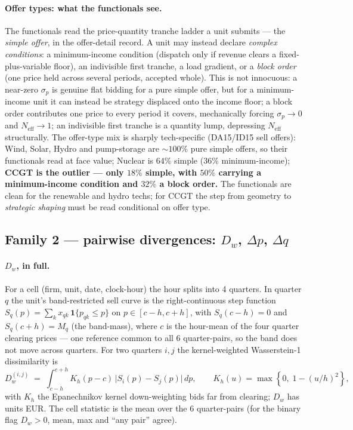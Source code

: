 \documentclass[11pt,a4paper]{article}
\begin{document}
\paragraph{Offer types: what the functionals see.} The functionals read the price-quantity tranche ladder a unit submits --- the \emph{simple offer}, in the offer-detail record. A unit may instead declare \emph{complex conditions}: a minimum-income condition (dispatch only if revenue clears a fixed-plus-variable floor), an indivisible first tranche, a load gradient, or a \emph{block order} (one price held across several periods, accepted whole). This is not innocuous: a near-zero $\sigma_p$ is genuine flat bidding for a pure simple offer, but for a minimum-income unit it can instead be strategy displaced onto the income floor; a block order contributes one price to every period it covers, mechanically forcing $\sigma_p \to 0$ and $N_{\text{eff}} \to 1$; an indivisible first tranche is a quantity lump, depressing $N_{\text{eff}}$ structurally. The offer-type mix is sharply tech-specific (DA15/ID15 sell offers): Wind, Solar, Hydro and pump-storage are $\sim\!100\%$ pure simple offers, so their functionals read at face value; Nuclear is $64\%$ simple ($36\%$ minimum-income); \textbf{CCGT is the outlier --- only $18\%$ simple, with $50\%$ carrying a minimum-income condition and $32\%$ a block order.} The functionals are clean for the renewable and hydro techs; for CCGT the step from geometry to \emph{strategic shaping} must be read conditional on offer type.

\subsection{Family 2 --- pairwise divergences: $D_w$, $\Delta p$, $\Delta q$}\label{sec:prov:dw_decomp_def}

\paragraph{$D_w$, in full.}
For a cell (firm, unit, date, clock-hour) the hour splits into 4 quarters. In quarter $q$ the unit's band-restricted sell curve is the right-continuous step function $S_q(p) = \sum_k x_{qk}\,\mathbf{1}\{p_{qk}\le p\}$ on $p\in[c-h,c+h]$, with $S_q(c-h)=0$ and $S_q(c+h)=M_q$ (the band-mass), where $c$ is the hour-mean of the four quarter clearing prices --- one reference common to all 6 quarter-pairs, so the band does not move across quarters. For two quarters $i,j$ the kernel-weighted Wasserstein-1 dissimilarity is
\[
 D^{(i,j)}_w \;=\; \int_{c-h}^{c+h}\! K_h(p-c)\,\big|S_i(p)-S_j(p)\big|\,dp, \qquad K_h(u) = \max\!\left\{0,\;1-(u/h)^2\right\},
\]
with $K_h$ the Epanechnikov kernel down-weighting bids far from clearing; $D_w$ has units EUR. The cell statistic is the mean over the 6 quarter-pairs (for the binary flag $D_w>0$, mean, max and ``any pair'' agree).
\end{document}
